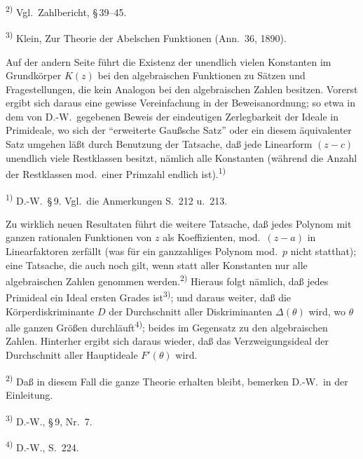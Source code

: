 \documentclass[12pt,a4paper]{article}
\begin{document}
\smallskip
\noindent\textsuperscript{2)} Vgl.\ Zahlbericht, \S\,39--45.

\smallskip
\noindent\textsuperscript{3)} Klein, Zur Theorie der Abelschen Funktionen (Ann.\ 36, 1890).

Auf der andern Seite f\"uhrt die Existenz der unendlich vielen Konstanten im Grundk\"orper $K(z)$ bei den algebraischen Funktionen zu S\"atzen und Fragestellungen, die kein Analogon bei den algebraischen Zahlen besitzen. Vorerst ergibt sich daraus eine gewisse Vereinfachung in der Beweisanordnung; so etwa in dem von D.-W.\ gegebenen Beweis der eindeutigen Zerlegbarkeit der Ideale in Primideale, wo sich der ``erweiterte Gau\ss{}sche Satz'' oder ein diesem \"aquivalenter Satz umgehen l\"a\ss{}t durch Benutzung der Tatsache, da\ss{} jede Linearform $(z-c)$ unendlich viele Restklassen besitzt, n\"amlich alle Konstanten (w\"ahrend die Anzahl der Restklassen mod.\ einer Primzahl endlich ist).\textsuperscript{1)}

\smallskip
\noindent\textsuperscript{1)} D.-W.\ \S\,9. Vgl.\ die Anmerkungen S.\ 212 u.\ 213.

Zu wirklich neuen Resultaten f\"uhrt die weitere Tatsache, da\ss{} jedes Polynom mit ganzen rationalen Funktionen von $z$ als Koeffizienten, mod.\ $(z-a)$ in Linearfaktoren zerf\"allt (was f\"ur ein ganzzahliges Polynom mod.\ $p$ nicht statthat); eine Tatsache, die auch noch gilt, wenn statt aller Konstanten nur alle algebraischen Zahlen genommen werden.\textsuperscript{2)} Hieraus folgt n\"amlich, da\ss{} jedes Primideal ein Ideal ersten Grades ist\textsuperscript{3)}; und daraus weiter, da\ss{} die K\"orperdiskriminante $D$ der Durchschnitt aller Diskriminanten $\varDelta(\theta)$ wird, wo $\theta$ alle ganzen Gr\"o\ss{}en durchl\"auft\textsuperscript{4)}; beides im Gegensatz zu den algebraischen Zahlen. Hinterher ergibt sich daraus wieder, da\ss{} das Verzweigungsideal der Durchschnitt aller Hauptideale $F'(\theta)$ wird.

\smallskip
\noindent\textsuperscript{2)} Da\ss{} in diesem Fall die ganze Theorie erhalten bleibt, bemerken D.-W.\ in der Einleitung.

\smallskip
\noindent\textsuperscript{3)} D.-W., \S\,9, Nr.\ 7.

\smallskip
\noindent\textsuperscript{4)} D.-W., S.\ 224.
\end{document}
